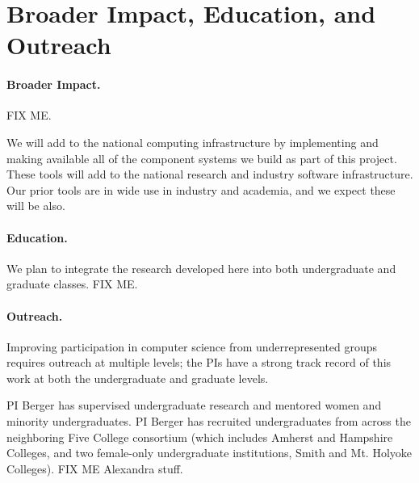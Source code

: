 \section{Broader Impact, Education, and Outreach}
\label{sec:impact}

\paragraph{Broader Impact.} 
FIX ME.

We will add to the national computing infrastructure by implementing
and making available all of the component
systems we build as part of this project.  These tools will add to the national research and industry
software infrastructure. Our prior tools are in wide use in industry
and academia, and we expect these will be also.

\paragraph{Education.}
We plan to integrate the research developed here into both
undergraduate and graduate classes. FIX ME.

\paragraph{Outreach.}
Improving participation in computer science from underrepresented groups
requires outreach at multiple levels; the PIs have a strong track record
of this work at both the undergraduate and graduate levels.

PI Berger has supervised undergraduate research and
mentored women and minority undergraduates. PI Berger has recruited undergraduates from
across the neighboring Five College consortium (which includes Amherst
and Hampshire Colleges, and two female-only undergraduate institutions,
Smith and Mt. Holyoke Colleges). FIX ME Alexandra stuff.

